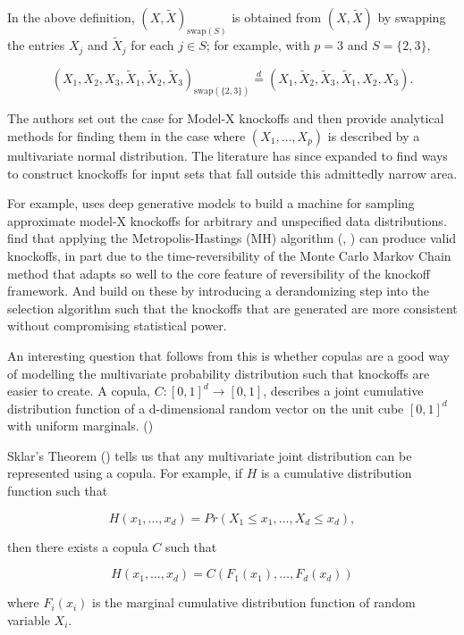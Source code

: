 \documentclass[review]{elsarticle}
\begin{document}
In the above definition, $(X,\tilde{X})_{\text{swap}(S)}$ is obtained from $(X,\tilde{X})$ by swapping the entries $X_j$ and $\tilde{X}_j$ for each $j\in S$; for example, with $p=3$ and $S=\{2,3\}$,

$$(X_1,X_2,X_3,\tilde{X}_1,\tilde{X}_2,\tilde{X}_3)_{\text{swap}(\{2,3\})}\stackrel{d}{=}(X_1,\tilde{X}_2,\tilde{X}_3,\tilde{X}_1,X_2,X_3).$$

The authors set out the case for Model-X knockoffs and then provide analytical methods for finding them in the case where $(X_1,\dots,X_p)$ is described by a multivariate normal distribution. The literature has since expanded to find ways to construct knockoffs for input sets that fall outside this admittedly narrow area.

For example, \citet{romano2020deep} uses deep generative models to build a machine for sampling approximate model-X knockoffs for arbitrary and unspecified data distributions. \citet{bates2021metropolized} find that applying the Metropolis-Hastings (MH) algorithm (\citet{metropolis1953equation}, \citet{hastings1970monte}) can produce valid knockoffs, in part due to the time-reversibility of the Monte Carlo Markov Chain method that adapts so well to the core feature of reversibility of the knockoff framework. And \citet{ren2021derandomizing} build on these by introducing a derandomizing step into the selection algorithm such that the knockoffs that are generated are more consistent without compromising statistical power.

An interesting question that follows from this is whether copulas are a good way of modelling the multivariate probability distribution such that knockoffs are easier to create. A copula, $C:[0,1]^d \rightarrow[0,1]$, describes a joint cumulative distribution function of a d-dimensional random vector on the unit cube $[0,1]^d$ with uniform marginals. (\citet{nelsen2007copula})

Sklar's Theorem (\citet{sklar1959fonctions}) tells us that any multivariate joint distribution can be represented using a copula. For example, if $H$ is a cumulative distribution function such that

$$H(x_1,\dots,x_d)=Pr(X_1\le x_1,\dots,X_d\le x_d),$$

then there exists a copula $C$ such that

$$H(x_1,\dots,x_d)=C(F_1(x_1),\dots,F_d(x_d))$$

where $F_i(x_i)$ is the marginal cumulative distribution function of random variable $X_i$.
\end{document}
